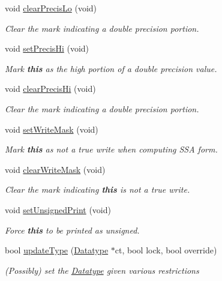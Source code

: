 \begin{DoxyCompactItemize}
void \mbox{\hyperlink{class_varnode_a75b4ed13f2045f91e153206b061341e0}{clear\+Precis\+Lo}} (void)
\begin{DoxyCompactList}\small\item\em Clear the mark indicating a double precision portion. \end{DoxyCompactList}\item 
void \mbox{\hyperlink{class_varnode_ad7569812931abb759cd4150aab347f7f}{set\+Precis\+Hi}} (void)
\begin{DoxyCompactList}\small\item\em Mark {\bfseries{this}} as the high portion of a double precision value. \end{DoxyCompactList}\item 
void \mbox{\hyperlink{class_varnode_a08350738b4fd77d372f6aa9aeef784ce}{clear\+Precis\+Hi}} (void)
\begin{DoxyCompactList}\small\item\em Clear the mark indicating a double precision portion. \end{DoxyCompactList}\item 
void \mbox{\hyperlink{class_varnode_ae5fb93c31c77ab156b9a9a88045e83db}{set\+Write\+Mask}} (void)
\begin{DoxyCompactList}\small\item\em Mark {\bfseries{this}} as not a true {\itshape write} when computing S\+SA form. \end{DoxyCompactList}\item 
void \mbox{\hyperlink{class_varnode_a115e29fabb2032903e93166339f19184}{clear\+Write\+Mask}} (void)
\begin{DoxyCompactList}\small\item\em Clear the mark indicating {\bfseries{this}} is not a true write. \end{DoxyCompactList}\item 
void \mbox{\hyperlink{class_varnode_a356ee1ae819a8bd9ffb225b640d2979f}{set\+Unsigned\+Print}} (void)
\begin{DoxyCompactList}\small\item\em Force {\bfseries{this}} to be printed as unsigned. \end{DoxyCompactList}\item 
bool \mbox{\hyperlink{class_varnode_a48932e5bf8aab53ae9b3a6a6d9b25ce8}{update\+Type}} (\mbox{\hyperlink{class_datatype}{Datatype}} $\ast$ct, bool lock, bool override)
\begin{DoxyCompactList}\small\item\em (Possibly) set the \mbox{\hyperlink{class_datatype}{Datatype}} given various restrictions \end{DoxyCompactList}\item 

\end{DoxyCompactItemize}
